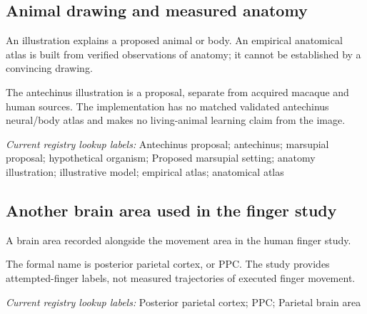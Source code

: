 \begin{samepage}
\subsection*{Animal drawing and measured anatomy}
\noindent An illustration explains a proposed animal or body. An empirical anatomical atlas is built from verified observations of anatomy; it cannot be established by a convincing drawing.\par
\end{samepage}
\begin{samepage}
\noindent The antechinus illustration is a proposal, separate from acquired macaque and human sources. The implementation has no matched validated antechinus neural/body atlas and makes no living-animal learning claim from the image.\par\nopagebreak[4]

\end{samepage}


\noindent\textit{Current registry lookup labels:} Antechinus proposal; antechinus; marsupial proposal; hypothetical organism; Proposed marsupial setting; anatomy illustration; illustrative model; empirical atlas; anatomical atlas\par

\begin{samepage}
\subsection*{Another brain area used in the finger study}
\noindent A brain area recorded alongside the movement area in the human finger study.\par
\end{samepage}
\begin{samepage}
\noindent The formal name is posterior parietal cortex, or PPC. The study provides attempted-finger labels, not measured trajectories of executed finger movement.\par\nopagebreak[4]

\end{samepage}


\noindent\textit{Current registry lookup labels:} Posterior parietal cortex; PPC; Parietal brain area\par


